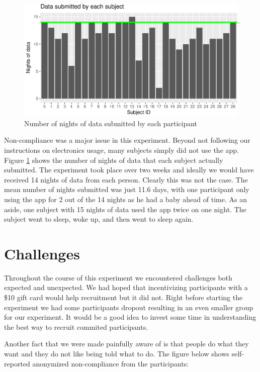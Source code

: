\documentclass[12pt,]{article}
\begin{document}
\begin{figure}
\centering
\includegraphics{report_files/figure-latex/days_used-1.pdf}
\caption{\label{fig:days_used} Number of nights of data submitted by
each participant}
\end{figure}

Non-compliance was a major issue in this experiment. Beyond not
following our instructions on electronics usage, many subjects simply
did not use the app. Figure \ref{fig:days_used} shows the number of
nights of data that each subject actually submitted. The experiment took
place over two weeks and ideally we would have received 14 nights of
data from each person. Clearly this was not the case. The mean number of
nights submitted was just 11.6 days, with one participant only using the
app for 2 out of the 14 nights as he had a baby ahead of time. As an
aside, one subject with 15 nights of data used the app twice on one
night. The subject went to sleep, woke up, and then went to sleep again.

\section{Challenges}\label{challenges}

Throughout the course of this experiment we encountered challenges both
expected and unexpected. We had hoped that incentivizing participants
with a \$10 gift card would help recruitment but it did not. Right
before starting the experiment we had some participants dropout
resulting in an even smaller group for our experiment. It would be a
good idea to invest some time in understanding the best way to recruit
commited participants.

Another fact that we were made painfully aware of is that people do what
they want and they do not like being told what to do. The figure below
shows self-reported anonymized non-compliance from the participants:
\end{document}
